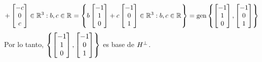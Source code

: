 \begin{solution}
\begin{align*}
{		+
		\begin{bmatrix}
			-c \\ 0 \\ c
		\end{bmatrix}
		\in\rmath[3]: b, c\in\rmath
		}=\set{
		b
		\begin{bmatrix}
			-1 \\ 1 \\ 0
		\end{bmatrix}
		+
		c
		\begin{bmatrix}
			-1 \\ 0 \\ 1
		\end{bmatrix}
		\in\rmath[3]: b, c\in\rmath
		} =\mgen[1]{\set{
		\begin{bmatrix}
			-1 \\ 1 \\ 0
		\end{bmatrix},
		\begin{bmatrix}
			-1 \\ 0 \\ 1
		\end{bmatrix}
		}}
	\end{align*}
	Por lo tanto, $\left\{ 
		\begin{bmatrix}
			-1 \\ 1 \\ 0
		\end{bmatrix},
		\begin{bmatrix}
			-1 \\ 0 \\ 1
		\end{bmatrix}
	 \right\}$ es base de $\mperp{H}$.
\end{solution}